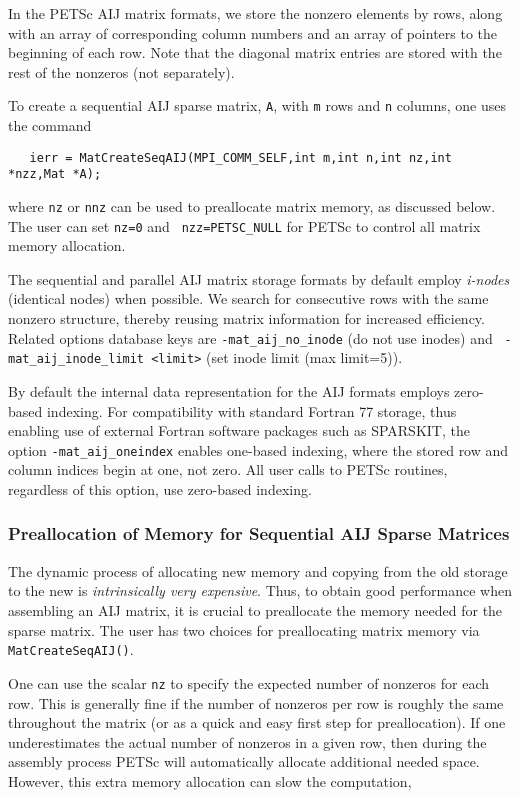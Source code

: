In the PETSc AIJ matrix formats, we store the nonzero elements
by rows, along with an array of corresponding column numbers and
an array of pointers to the beginning of each row.  Note that the
diagonal matrix entries are stored with the rest of the nonzeros (not
separately). 

To create a sequential AIJ sparse matrix, {\tt A}, 
 with {\tt m} rows and {\tt n} columns,
one uses the command
\begin{verbatim}
   ierr = MatCreateSeqAIJ(MPI_COMM_SELF,int m,int n,int nz,int *nzz,Mat *A);
\end{verbatim}
where {\tt nz} or {\tt nnz} can be used to preallocate matrix memory,
as discussed below. The user can set {\tt nz=0} and {\tt
nzz=PETSC\_NULL} for PETSc to control all matrix memory allocation.

The sequential and parallel AIJ matrix storage formats by default
employ {\em i-nodes} (identical nodes) when possible.  We search for
consecutive rows with the same nonzero structure, thereby reusing
matrix information for increased efficiency.  Related options database
keys are {\tt -mat\_aij\_no\_inode} (do not use inodes) and {\tt
-mat\_aij\_inode\_limit <limit>} (set inode limit (max limit=5)).

By default the internal data representation for the AIJ formats employs
zero-based indexing.  For compatibility with standard Fortran 77 storage,
thus enabling use of external Fortran software packages such as
SPARSKIT,  the option {\tt -mat\_aij\_oneindex}
 enables one-based indexing, where the stored
row and column indices begin at one, not zero.  All user calls to
PETSc routines, regardless of this option, use zero-based indexing.

\subsubsection{Preallocation of Memory for Sequential AIJ Sparse Matrices}

The dynamic process of allocating new memory and copying from the old
storage to the new is {\em intrinsically very expensive}.  Thus, to
obtain good performance when assembling an AIJ matrix, it is crucial
to preallocate the memory needed for the sparse matrix.  The user has
two choices for preallocating matrix memory via {\tt
MatCreateSeqAIJ()}. 

One can use the scalar {\tt nz} to specify the expected
number of nonzeros for each row.  This is generally fine if the number
of nonzeros per row is roughly the same throughout the matrix (or as a
quick and easy first step for preallocation).  If one underestimates
the actual number of nonzeros in a given row, then during the assembly
process PETSc will automatically allocate additional needed space.
However, this extra memory allocation can slow the computation,

